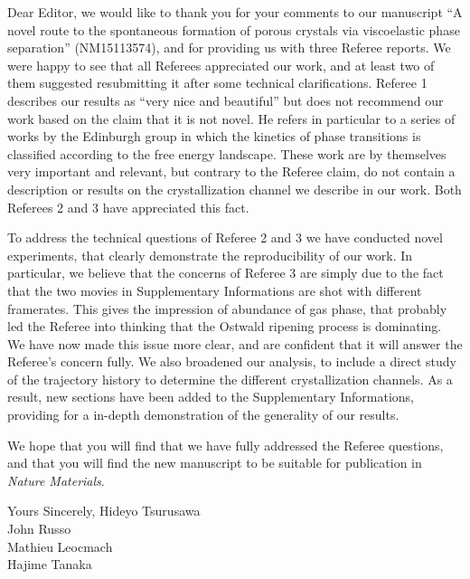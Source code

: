 \documentclass[11pt]{article}
\begin{document}
\doublespacing



\doublespacing

\noindent
Dear Editor,
\vskip 0.3cm
we would like to thank you for your comments to our manuscript ``A novel route to the spontaneous formation of porous crystals via viscoelastic phase separation'' (NM15113574),
and for providing us with three Referee reports.
We were happy to see that all Referees appreciated our work, and at least two of them suggested
resubmitting it after some technical clarifications. Referee 1 describes our results as ``very nice and beautiful'' but does not recommend our work
based on the claim that it is not novel. He refers in particular to a series of works by the Edinburgh group in which the kinetics of phase
transitions is classified according to the free energy landscape. These work are by themselves very important and relevant, but contrary
to the Referee claim, do not contain a description or results on the crystallization channel we describe in our work.
Both Referees 2 and 3 have appreciated this fact.

To address the technical questions of Referee 2 and 3 we have conducted novel experiments, that clearly demonstrate the reproducibility
of our work. In particular, we believe that the concerns of Referee 3 are simply due to the fact that the two movies in Supplementary Informations
are shot with different framerates. This gives the impression of abundance of gas phase, that probably led the Referee into thinking that the Ostwald
ripening process is dominating. We have now made this issue more clear, and are confident that it will answer the Referee's concern fully.
We also broadened our analysis, to include a direct study of the trajectory history to determine the different crystallization
channels. As a result, new sections have been added to the Supplementary Informations, providing for a in-depth demonstration of the generality of our results.

We hope that you will find that we have fully addressed the Referee questions, and
that you will find the new manuscript to be suitable for publication in \emph{Nature Materials}.




\vskip 0.8cm

\noindent
Yours Sincerely,
\vskip 0.3cm
\indent Hideyo Tsurusawa\\
\indent John Russo\\
\indent Mathieu Leocmach\\
\indent Hajime Tanaka
\end{document}
